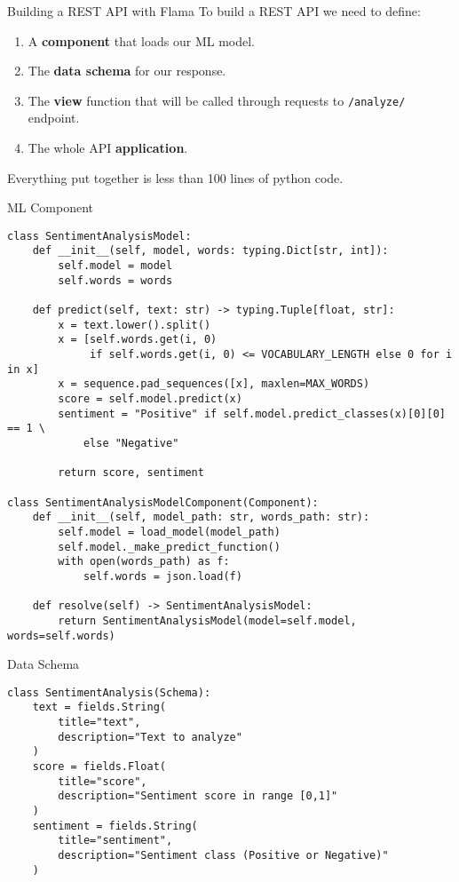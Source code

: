 \begin{frame}{Building a REST API with Flama}
    To build a REST API we need to define:

    \begin{enumerate}
        \item A \textbf{component} that loads our ML model.
        \item The \textbf{data schema} for our response.
        \item The \textbf{view} function that will be called through requests to \texttt{/analyze/} endpoint.
        \item The whole API \textbf{application}.
    \end{enumerate}

    Everything put together is less than 100 lines of python code.
\end{frame}

\begin{frame}[fragile]{ML Component}
    \begin{verbatim}
class SentimentAnalysisModel:
    def __init__(self, model, words: typing.Dict[str, int]):
        self.model = model
        self.words = words

    def predict(self, text: str) -> typing.Tuple[float, str]:
        x = text.lower().split()
        x = [self.words.get(i, 0)
             if self.words.get(i, 0) <= VOCABULARY_LENGTH else 0 for i in x]
        x = sequence.pad_sequences([x], maxlen=MAX_WORDS)
        score = self.model.predict(x)
        sentiment = "Positive" if self.model.predict_classes(x)[0][0] == 1 \
            else "Negative"

        return score, sentiment

class SentimentAnalysisModelComponent(Component):
    def __init__(self, model_path: str, words_path: str):
        self.model = load_model(model_path)
        self.model._make_predict_function()
        with open(words_path) as f:
            self.words = json.load(f)

    def resolve(self) -> SentimentAnalysisModel:
        return SentimentAnalysisModel(model=self.model, words=self.words)
    \end{verbatim}
\end{frame}

\begin{frame}[fragile]{Data Schema}
    \begin{verbatim}
class SentimentAnalysis(Schema):
    text = fields.String(
        title="text",
        description="Text to analyze"
    )
    score = fields.Float(
        title="score",
        description="Sentiment score in range [0,1]"
    )
    sentiment = fields.String(
        title="sentiment",
        description="Sentiment class (Positive or Negative)"
    )
    \end{verbatim}
\end{frame}

